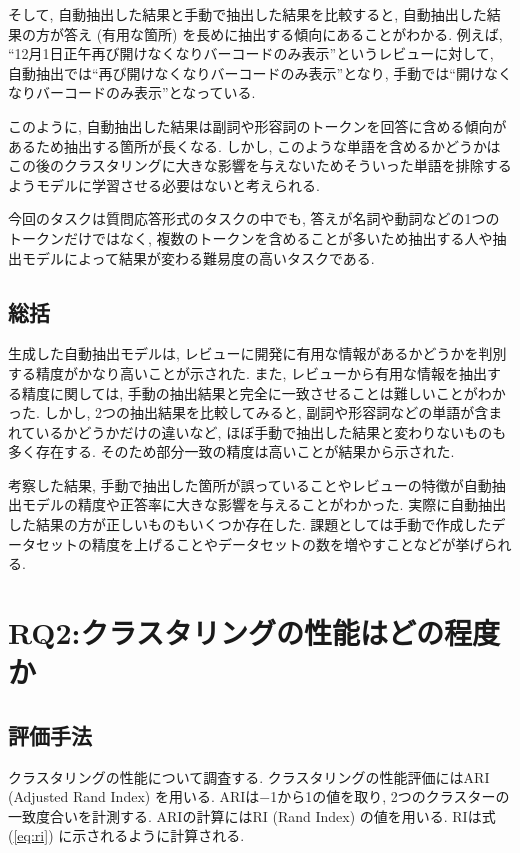 そして, 自動抽出した結果と手動で抽出した結果を比較すると, 自動抽出した結果の方が答え (有用な箇所) を長めに抽出する傾向にあることがわかる. 
例えば, ``12月1日正午再び開けなくなりバーコードのみ表示''というレビューに対して, 自動抽出では``再び開けなくなりバーコードのみ表示''となり, 手動では``開けなくなりバーコードのみ表示''となっている. 

このように, 自動抽出した結果は副詞や形容詞のトークンを回答に含める傾向があるため抽出する箇所が長くなる. しかし, このような単語を含めるかどうかはこの後のクラスタリングに大きな影響を与えないためそういった単語を排除するようモデルに学習させる必要はないと考えられる. 

今回のタスクは質問応答形式のタスクの中でも, 答えが名詞や動詞などの1つのトークンだけではなく, 複数のトークンを含めることが多いため抽出する人や抽出モデルによって結果が変わる難易度の高いタスクである. 


\subsection{総括}
生成した自動抽出モデルは, レビューに開発に有用な情報があるかどうかを判別する精度がかなり高いことが示された. 
また, レビューから有用な情報を抽出する精度に関しては, 手動の抽出結果と完全に一致させることは難しいことがわかった. しかし, 2つの抽出結果を比較してみると, 副詞や形容詞などの単語が含まれているかどうかだけの違いなど, ほぼ手動で抽出した結果と変わりないものも多く存在する. そのため部分一致の精度は高いことが結果から示された. 

考察した結果, 手動で抽出した箇所が誤っていることやレビューの特徴が自動抽出モデルの精度や正答率に大きな影響を与えることがわかった. 実際に自動抽出した結果の方が正しいものもいくつか存在した. 課題としては手動で作成したデータセットの精度を上げることやデータセットの数を増やすことなどが挙げられる. 


\section{RQ2:クラスタリングの性能はどの程度か}
\subsection{評価手法}
クラスタリングの性能について調査する. クラスタリングの性能評価にはARI (Adjusted Rand Index) を用いる. ARIは$-$1から1の値を取り, 2つのクラスターの一致度合いを計測する. 
ARIの計算にはRI (Rand Index) の値を用いる. RIは式 (\ref{eq:ri}) に示されるように計算される. 

